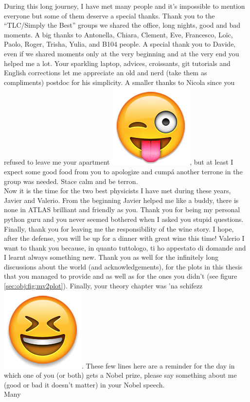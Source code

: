 \noindent During this long journey, I have met many people and it's impossible to mention everyone but some of them deserve a special thanks. Thank you to the ``TLC/Simply the Best'' groups we shared the office, long nights, good and bad moments. A big thanks to Antonella, Chiara, Clement, Eve, Francesco, Lo\"{i}c, Paolo, Roger, Trisha, Yulia, and B104 people. A special thank you to Davide, even if we shared moments only at the very beginning and at the very end you helped me a lot. Your sparkling laptop, advices, croissants, git tutorials and English corrections let me appreciate an old and nerd (take them as compliments) postdoc for his simplicity. A smaller thanks to Nicola since you refused to leave me your apartment \includegraphics[height=1.5\fontcharht\font`A]{figures/ack/EmojiSmiley/EmojiSmiley-12.png}, but at least I expect some good food from you to apologize and cump\'a another terrone in the group was needed. Stace calm and be terron. \\ Now it is the time for the two best physicists I have met during these years, Javier and Valerio. From the beginning Javier helped me like a buddy, there is none in ATLAS brilliant and friendly as you. Thank you for being my personal python guru and you never seemed bothered when I asked you stupid questions. Finally, thank you for leaving me the responsibility of the wine story. I hope, after the defense, you will be up for a dinner with great wine this time! Valerio I want to thank you because, in quanto tuttologo, ti ho appestato di domande and I learnt always something new. Thank you as well for the infinitely long discussions about the world (and acknowledgements), for the plots in this thesis that you managed to provide and as well as for the ones you didn't (see figure \ref{sec:obj:fig:mv2plot}). Finally, your theory chapter was 'na schifezz \includegraphics[height=1.5\fontcharht\font`A]{figures/ack/EmojiSmiley/EmojiSmiley-38.png}. These few lines here are a reminder for the day in which one of you (or both) gets a Nobel prize, please say something about me (good or bad it doesn't matter) in your Nobel speech.\\ Many 
